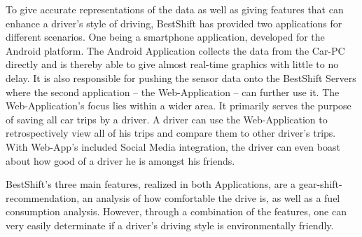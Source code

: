 To give accurate representations of the data as well as giving features that can enhance a driver’s style of driving, BestShift has provided two applications for different scenarios. One being a smartphone application, developed for the Android platform. The Android Application collects the data from the Car-PC directly and is thereby able to give almost real-time graphics with little to no delay. It is also responsible for pushing the sensor data onto the BestShift Servers where the second application – the Web-Application – can further use it. The Web-Application’s focus lies within a wider area. It primarily serves the purpose of saving all car trips by a driver. A driver can use the Web-Application to retrospectively view all of his trips and compare them to other driver’s trips. With Web-App’s included Social Media integration, the driver can even boast about how good of a driver he is amongst his friends.

BestShift’s three main features, realized in both Applications, are a gear-shift-recommendation, an analysis of how comfortable the drive is, as well as a fuel consumption analysis. However, through a combination of the features, one can very easily determinate if a driver’s driving style is environmentally friendly.